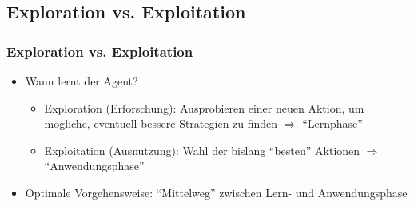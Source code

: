 \subsection{Exploration vs. Exploitation}
\begin{frame}
  \frametitle{Exploration vs. Exploitation}
  \begin{itemize}
    \item Wann lernt der Agent?
    \begin{itemize}
      \item Exploration (Erforschung): Ausprobieren einer neuen Aktion, um
      mögliche, eventuell bessere Strategien zu finden $\Rightarrow$ "`Lernphase"'
      \item Exploitation (Ausnutzung): Wahl der bislang "`besten"' Aktionen
      $\Rightarrow$ "`Anwendungsphase"'
    \end{itemize}
    \item Optimale Vorgehensweise: "`Mittelweg"' zwischen Lern- und
    Anwendungsphase
  \end{itemize}
\end{frame}